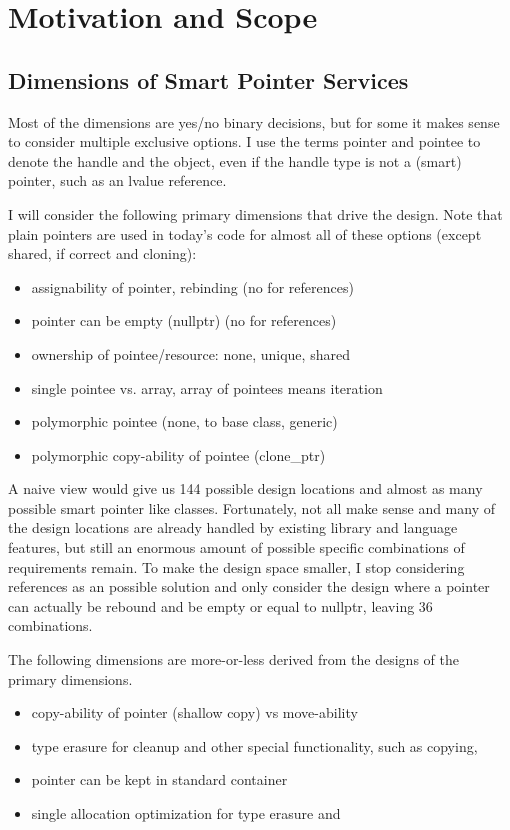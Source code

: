 \documentclass[ebook,11pt,article]{memoir}
\begin{document}
\chapter{Motivation and Scope}
\section{Dimensions of Smart Pointer Services}
Most of the dimensions are yes/no binary decisions, but for some it makes sense to consider multiple exclusive options. I use the terms pointer and pointee to denote the handle and the object, even  if the handle type is not a (smart) pointer, such as an lvalue reference.

I will consider the following primary dimensions that drive the design. Note that plain pointers are used in today's code for almost all of these options (except shared, if correct and cloning):
\begin{itemize}
\item assignability of pointer, rebinding (no for references)
\item pointer can be empty (nullptr) (no for references)
\item ownership of pointee/resource: none, unique, shared 
\item single pointee vs. array, array of pointees means iteration
\item polymorphic pointee (none, to base class, generic)
\item polymorphic copy-ability of pointee (clone_ptr)
\end{itemize}
A naive view would give us 144 possible design locations and almost as many possible smart pointer like classes. Fortunately, not all make sense and many of the design locations are already handled by existing library and language features, but still an enormous amount of possible specific combinations of requirements remain. To make the design space smaller, I stop considering references as an possible solution and only consider the design where a pointer can actually be rebound and be empty or equal to nullptr, leaving 36 combinations.

The following dimensions are more-or-less derived from the designs of the primary dimensions.
\begin{itemize}
\item copy-ability of pointer (shallow copy) vs move-ability
\item type erasure for cleanup and other special functionality, such as copying, 
\item pointer can be kept in standard container
\item single allocation optimization for type erasure and 
\end{itemize}
\end{document}
